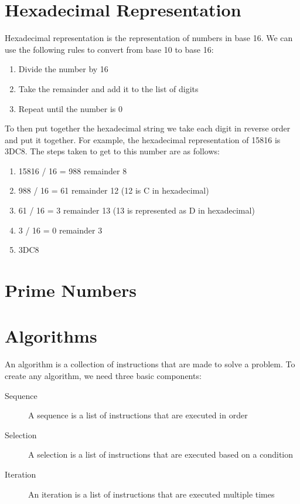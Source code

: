 \documentclass[11pt]{article}
\begin{document}
\section{Hexadecimal Representation}
\label{sec:orgef4295b}
Hexadecimal representation is the representation of numbers in base 16. We can use the following rules to convert from base 10 to base 16:
\begin{enumerate}
\item Divide the number by 16
\item Take the remainder and add it to the list of digits
\item Repeat until the number is 0
\end{enumerate}

To then put together the hexadecimal string we take each digit in reverse order and put it together. For example, the hexadecimal representation of 15816 is 3DC8. The steps taken to get to this number are as follows:
\begin{enumerate}
\item 15816 / 16 = 988 remainder 8
\item 988 / 16 = 61 remainder 12 (12 is C in hexadecimal)
\item 61 / 16 = 3 remainder 13 (13 is represented as D in hexadecimal)
\item 3 / 16 = 0 remainder 3
\item 3DC8
\end{enumerate}

\section{Prime Numbers}
\label{sec:org1ba44e4}
\section{Algorithms}
\label{sec:orgde22366}
An algorithm is a collection of instructions that are made to solve a problem. To create any algorithm, we need three basic components:
\begin{description}
\item[{Sequence}] A sequence is a list of instructions that are executed in order
\item[{Selection}] A selection is a list of instructions that are executed based on a condition
\item[{Iteration}] An iteration is a list of instructions that are executed multiple times
\end{description}
\end{document}
